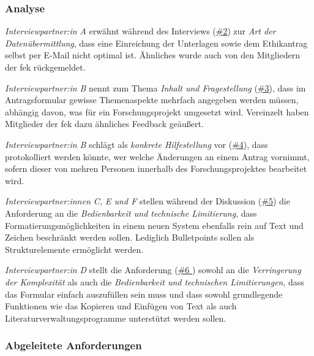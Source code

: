 \documentclass[a4paper,12pt,twoside]{scrreprt}
\begin{document}
\subsubsection*{Analyse}
\label{sub-sub-sec:analyse-während-erstellung-einreichung}

\textit{Interviewpartner:in A} erwähnt während des Interviews (\hyperref[tab:anforderungen-während-erstellung-einreichung]{\#2}) zur \textit{Art der Datenübermittlung}, dass eine Einreichung der Unterlagen sowie dem Ethikantrag selbst per E-Mail nicht optimal ist. Ähnliches wurde auch von den Mitgliedern der \ac{fek} rückgemeldet.

\medskip

\textit{Interviewpartner:in B} nennt zum Thema \textit{Inhalt und Fragestellung} (\hyperref[tab:anforderungen-während-erstellung-einreichung]{\#3}), dass im Antragsformular gewisse Themenaspekte mehrfach angegeben werden müssen, abhängig davon, was für ein Forschungsprojekt umgesetzt wird. Vereinzelt haben Mitglieder der \ac{fek} dazu ähnliches Feedback geäußert.

\medskip

\textit{Interviewpartner:in B} schlägt als \textit{konkrete Hilfestellung} vor (\hyperref[tab:anforderungen-während-erstellung-einreichung]{\#4}), dass protokolliert werden könnte, wer welche Änderungen an einem Antrag vornimmt, sofern dieser von mehren Personen innerhalb des Forschungsprojektes bearbeitet wird.

\medskip

\textit{Interviewpartner:innen C, E und F} stellen während der Diskussion (\hyperref[tab:anforderungen-während-erstellung-einreichung]{\#5}) die Anforderung an die \textit{Bedienbarkeit und technische Limitierung}, dass Formatierungsmöglichkeiten in einem neuen System ebenfalls rein auf Text und Zeichen beschränkt werden sollen. Lediglich Bulletpoints sollen als Strukturelemente ermöglicht werden.

\medskip

\textit{Interviewpartner:in D} stellt die Anforderung (\hyperref[tab:anforderungen-während-erstellung-einreichung]{\#6 }) sowohl an die \textit{Verringerung der Komplexität} als auch die \textit{Bedienbarkeit und technischen Limitierungen}, dass das Formular einfach auszufüllen sein muss und dass sowohl grundlegende Funktionen wie das Kopieren und Einfügen von Text als auch Literaturverwaltungsprogramme unterstützt werden sollen.

\subsubsection*{Abgeleitete Anforderungen}
\label{sub-sub-sec:abgeleitete-anforderungen-während-erstellung-einreichung}
\end{document}
